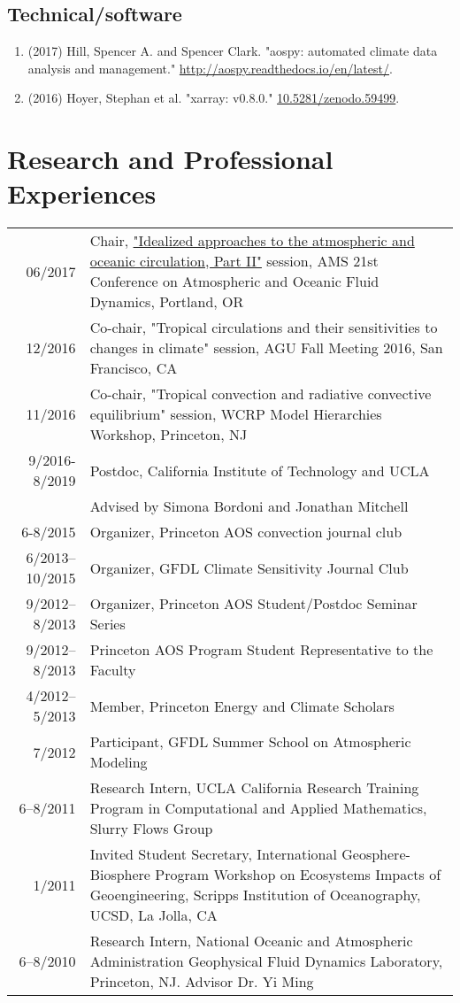 \documentclass[12pt,letterpaper]{shillcv}
\begin{document}
\subsection*{Technical/software}
\label{sec:orgd96ee11}
\begin{enumerate}
\item (2017) Hill, Spencer A. and Spencer Clark.  "aospy: automated climate data
analysis and management."  \url{http://aospy.readthedocs.io/en/latest/}.
\item (2016) Hoyer, Stephan et al.  "xarray: v0.8.0."  \href{https://doi.org/10.5281/zenodo.59499}{10.5281/zenodo.59499}.
\end{enumerate}
\section*{Research and Professional Experiences}
\label{sec:orgb21320d}
\begin{center}
\begin{tabularx}{\textwidth}{rX}
06/2017 & Chair, \href{https://ams.confex.com/ams/21Fluid19Middle/webprogram/Session43327.html}{"Idealized approaches to the atmospheric and oceanic circulation, Part II"} session, AMS 21st Conference on Atmospheric and Oceanic Fluid Dynamics, Portland, OR\\
12/2016 & Co-chair, "Tropical circulations and their sensitivities to changes in climate" session, AGU Fall Meeting 2016, San Francisco, CA\\
11/2016 & Co-chair, "Tropical convection and radiative convective equilibrium" session, WCRP Model Hierarchies Workshop, Princeton, NJ\\
9/2016-8/2019 & Postdoc, California Institute of Technology and UCLA\\
 & Advised by Simona Bordoni and Jonathan Mitchell\\
6-8/2015 & Organizer, Princeton AOS convection journal club\\
6/2013–10/2015 & Organizer, GFDL Climate Sensitivity Journal Club\\
9/2012–8/2013 & Organizer, Princeton AOS Student/Postdoc Seminar Series\\
9/2012–8/2013 & Princeton AOS Program Student Representative to the Faculty\\
4/2012–5/2013 & Member, Princeton Energy and Climate Scholars\\
7/2012 & Participant, GFDL Summer School on Atmospheric Modeling\\
6–8/2011 & Research Intern, UCLA California Research Training Program in Computational and Applied Mathematics, Slurry Flows Group\\
1/2011 & Invited Student Secretary, International Geosphere-Biosphere Program Workshop on Ecosystems Impacts of Geoengineering, Scripps Institution of Oceanography, UCSD, La Jolla, CA\\
6–8/2010 & Research Intern, National Oceanic and Atmospheric Administration Geophysical Fluid Dynamics Laboratory, Princeton, NJ. Advisor Dr. Yi Ming\\
\end{tabularx}
\end{center}
\end{document}
